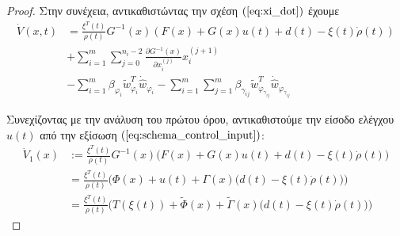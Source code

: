 \begin{proof}
Στην συνέχεια, αντικαθιστώντας την σχέση $(\ref{eq:xi_dot})$ έχουμε
\begin{equation}
	\begin{split}
	\dot{V}(x,t) &= 
	\frac{\xi^T(t)} {\rho(t)} G^{-1}(x) \left( F(x) + G(x)u(t) + d(t) - \xi(t)\dot{\rho}(t) \right)  \\
	&+ \sum_{i=1}^{m} \sum_{j=0}^{n_i - 2} 
	\frac{\partial G^{-1}(x) }{\partial x_i^{(j)}} x_i^{(j +1)}\\
	& - \sum_{i=1}^{m} \beta_{\varphi_i} 
	\tilde{w}_{\varphi_i}^{T} \dot{\hat{w}}_{\varphi_i} 
	- \sum_{i=1}^{m} \sum_{j=1}^{m} \beta_{\gamma_{ij}}
	\tilde{w}_{\varphi_{\gamma_{ij}}}^{T} \dot{\hat{w}}_{\varphi_{\gamma_{ij}}}
	\end{split}
\end{equation}

Συνεχίζοντας με την ανάλυση του πρώτου όρου, αντικαθιστούμε την είσοδο ελέγχου $u(t)$ από την εξίσωση $(\ref{eq:schema_control_input})$:
\begin{equation*}
\begin{split}
	\dot{V}_1(x) & := \frac{\xi^T(t)} {\rho(t)} G^{-1}(x) \Big( F(x) + G(x)u(t) + d(t) - \xi(t)\dot{\rho}(t) \Big)  \\
	 &=\frac{\xi^T(t)} {\rho(t)} \Big( \Phi(x) + u(t) 
	+  \Gamma(x) \big( d(t) - \xi(t)\dot{\rho}(t) \big)  \Big) \\
	 &=\frac{\xi^T(t)} {\rho(t)} \Big( T(\xi(t)) + \tilde{\Phi}(x)  
	 +  \tilde{\Gamma}(x) \big( d(t) - \xi(t)\dot{\rho}(t) \big)  \Big)
\end{split}
\end{equation*}

\end{proof}